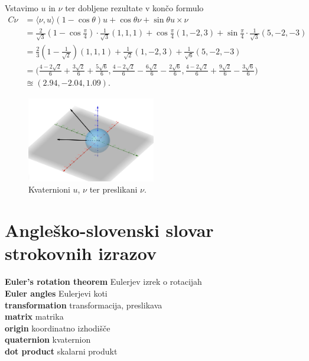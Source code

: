 \documentclass[a4paper,12pt]{article}
\newcommand{\geslo}[2]{\noindent\textbf{#1} \quad \hangindent=1cm #2\\[-1pc]}
\newcommand{\dotpr}[2]{\langle #1, #2 \rangle}
\begin{document}
Vstavimo $u$ in $\nu$ ter dobljene rezultate v končo formulo
\begin{align*}
   C\nu &= \dotpr{\nu}{u}(1 - \cos\theta)u + \cos\theta \nu + \sin\theta u\times\nu\\
        &= \frac{2}{\sqrt{3}}(1 - \cos\frac{\pi}{4}) \cdot \frac{1}{\sqrt{3}}(1,1,1) + \cos\frac{\pi}{4}(1,-2,3) + \sin\frac{\pi}{4} \cdot \frac{1}{\sqrt{3}}(5,-2,-3)\\
        &= \frac{2}{3}(1 - \frac{1}{\sqrt{2}})(1,1,1) + \frac{1}{\sqrt{2}}(1,-2,3) + \frac{1}{\sqrt{6}}(5,-2,-3)\\
        &= \big( \frac{4-2\sqrt{2}}{6} + \frac{3\sqrt{2}}{6} + \frac{5\sqrt{6}}{6},\frac{4-2\sqrt{2}}{6} - \frac{6\sqrt{2}}{6} - \frac{2\sqrt{6}}{6}, \frac{4-2\sqrt{2}}{6} + \frac{9\sqrt{2}}{6} - \frac{3\sqrt{6}}{6}\big)\\
        &\approxeq (2.94, -2.04, 1.09).
\end{align*}

\begin{figure}[h]
   \centering
   \includegraphics[width = 0.5\textwidth]{vektorji_nu_nu2}
   \caption{Kvaternioni $u$, $\nu$ ter preslikani $\nu$.}
\end{figure}


\newpage


\section*{Angleško-slovenski slovar strokovnih izrazov}

\geslo{Euler's rotation theorem}{Eulerjev izrek o rotacijah}

\geslo{Euler angles}{Eulerjevi koti}

\geslo{transformation}{transformacija, preslikava}

\geslo{matrix}{matrika}

\geslo{origin}{koordinatno izhodišče}

\geslo{quaternion}{kvaternion}

\geslo{dot product}{skalarni produkt}
\end{document}
